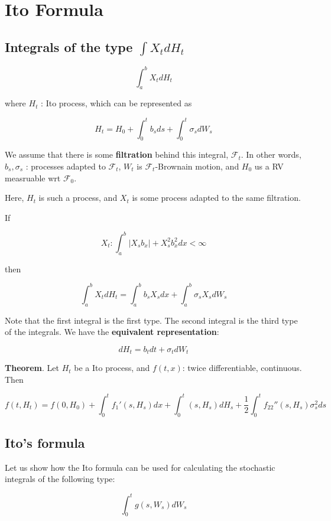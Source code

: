 \documentclass[12pt]{article}
\theoremstyle{nonumberbreak}
\begin{document}
\section{Ito Formula}

\subsection{Integrals of the type $\int X_t d H_t$}

$$
\int_a^b X_t dH_t
$$

where $H_t$ : Ito process, which can be represented as

$$
H_t = H_0 + \int_0^t b_s ds + \int_0^t \sigma_s dW_s
$$

We assume that there is some \textbf{filtration} behind this integral, $\mathcal{F}_t$. In other words, $b_s, \sigma_s$ : processes adapted to $\mathcal{F}_t$, $W_t$ is $\mathcal{F}_t$-Brownain motion, and $H_0$ us a RV measruable wrt $\mathcal{F}_0$.

Here, $H_t$ is such a process, and $X_t$ is some process adapted to the same filtration.  

If

$$
X_t: \int_a^b |X_s b_x| + X_s^2 b_x^2 dx < \infty
$$

then 

$$
\int_a^b X_t dH_t = \int_a^b b_s X_s dx + \int_a^b \sigma_s X_s dW_s
$$

Note that the first integral is the first type. The second integral is the third type of the integrals. We have the \textbf{equivalent representation}:

$$
dH_t = b_t dt + \sigma_t d W_t
$$

\begin{theorem}
\textbf{Theorem}. Let $H_t$ be a Ito process, and $f(t,x)$: twice differentiable, continuous. Then

$$
f(t,H_t) = f(0,H_0) + \int_0^t f_1' (s, H_s) dx + \int_0^t (s, H_s) dH_s + \frac{1}{2} \int_0^t f_{22}'' (s,H_s)\sigma_s^2 ds
$$
\end{theorem}


\subsection{Ito's formula}

Let us show how the Ito formula can be used for calculating the stochastic integrals of the following type:

$$
\int_0^t g(s, W_s) dW_s
$$
\end{document}
